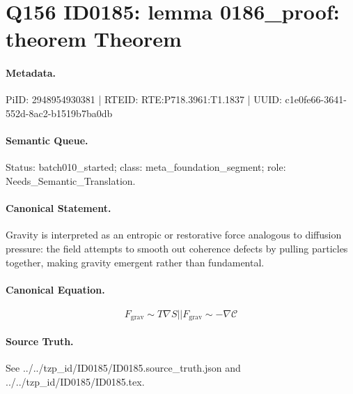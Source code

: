 \section*{Q156 ID0185: lemma 0186\_proof: theorem Theorem}
\paragraph{Metadata.}
PiID: 2948954930381 | RTEID: RTE:P718.3961:T1.1837 | UUID: c1e0fe66-3641-552d-8ac2-b1519b7ba0db

\paragraph{Semantic Queue.}
Status: batch010\_started; class: meta\_foundation\_segment; role: Needs\_Semantic\_Translation.

\paragraph{Canonical Statement.}
Gravity is interpreted as an entropic or restorative force analogous to diffusion pressure: the field attempts to smooth out coherence defects by pulling particles together, making gravity emergent rather than fundamental.

\paragraph{Canonical Equation.}
\[
F_{\mathrm{grav}} \sim T\nabla S || F_{\mathrm{grav}} \sim -\nabla \mathcal{C}
\]

\paragraph{Source Truth.}
See ../../tzp\_id/ID0185/ID0185.source\_truth.json and ../../tzp\_id/ID0185/ID0185.tex.
